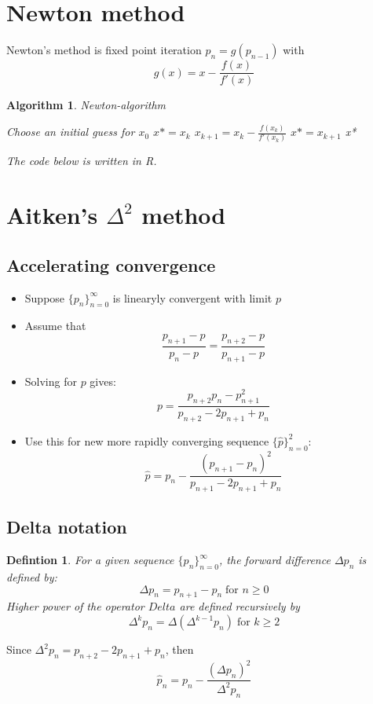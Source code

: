\documentclass[12pt]{article}
\newtheorem{alg}[theorem]{Algorithm}
\newtheorem*{definition}{Defintion}
\begin{document}
\section{Newton method}
Newton's method is fixed point iteration $p_n = g(p_{n-1})$ with $$g(x) = x - \frac{f(x)}{f'(x)}$$
\begin{alg}{Newton-algorithm}
\begin{algorithmic}
Choose an initial guess for $x_0$
\State $x* = x_{k}$
\State $x_{k+1} = x_k - \frac{f(x_k)}{f'(x_k)}$
\State $x* = x_{k+1}$
\State \Return x*
\EndIf
\EndFor	
\end{algorithmic}
The code below is written in R.
	
\end{alg}

\section{Aitken's $\Delta^2$ method}
\subsection{Accelerating convergence}
\begin{itemize}
	\item Suppose $\{p_n\}_{n=0}^{\infty}$ is linearyly convergent with limit $p$
	\item Assume that $$\frac{p_{n+1}-p}{p_n -p} = \frac{p_{n+2}-p}{p_{n+1} -p}$$
	\item Solving for $p$ gives: $$p = \frac{p_{n+2}p_n-p_{n+1}^2}{p_{n+2} -2p_{n+1}+p_n}$$
	\item Use this for new more rapidly converging sequence $\{\hat{p}\}_{n=0}^2$: $$\hat{p} = p_n -\frac{(p_{n+1} -p_n)^2}{p_{n+1} -2p_{n+1} +p_n}$$
\end{itemize}

\subsection{Delta notation}
\begin{definition}
	For a given sequence $\{p_n\}_{n=0}^{\infty}$, the forward difference $\Delta p_n$ is defined by:
	$$\Delta p_n = p_{n+1} - p_n \; \text{for $n \geq 0$}$$
	Higher power of the operator $Delta$ are defined recursively by $$\Delta^kp_n = \Delta(\Delta^{k-1}p_n) \; \text{for $k \geq 2$}$$
	\end{definition}
Since $\Delta^2p_n = p_{n+2} -2p_{n+1} + p_n$, then $$\hat{p}_n = p_n - \frac{(\Delta p_n)^2}{\Delta^2 p_n}$$
\end{document}
